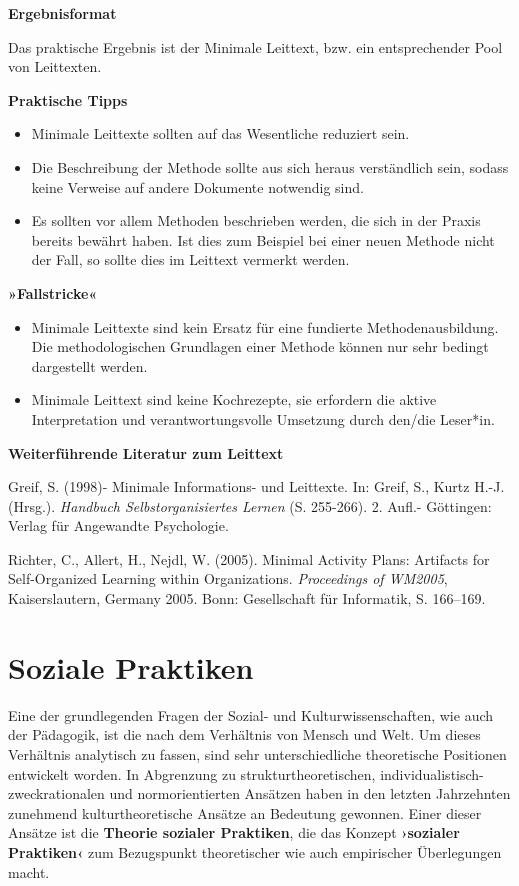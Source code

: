 \documentclass[
  a4paper,
]{book}
\providecommand{\tightlist}{%
  \setlength{\itemsep}{0pt}\setlength{\parskip}{0pt}}
\begin{document}
\textbf{Ergebnisformat}

Das praktische Ergebnis ist der Minimale Leittext, bzw. ein entsprechender Pool von Leittexten.

\textbf{Praktische Tipps}

\begin{itemize}
\tightlist
\item
  Minimale Leittexte sollten auf das Wesentliche reduziert sein.
\item
  Die Beschreibung der Methode sollte aus sich heraus verständlich sein, sodass keine Verweise auf andere Dokumente notwendig sind.
\item
  Es sollten vor allem Methoden beschrieben werden, die sich in der Praxis bereits bewährt haben. Ist dies zum Beispiel bei einer neuen Methode nicht der Fall, so sollte dies im Leittext vermerkt werden.
\end{itemize}

\textbf{»Fallstricke«}

\begin{itemize}
\tightlist
\item
  Minimale Leittexte sind kein Ersatz für eine fundierte Methodenausbildung. Die methodologischen Grundlagen einer Methode können nur sehr bedingt dargestellt werden.
\item
  Minimale Leittext sind keine Kochrezepte, sie erfordern die aktive Interpretation und verantwortungsvolle Umsetzung durch den/die Leser*in.
\end{itemize}

\textbf{Weiterführende Literatur zum Leittext}

Greif, S. (1998)- Minimale Informations- und Leittexte. In: Greif, S., Kurtz H.-J. (Hrsg.). \emph{Handbuch Selbstorganisiertes Lernen} (S. 255-266). 2. Aufl.- Göttingen: Verlag für Angewandte Psychologie.

Richter, C., Allert, H., Nejdl, W. (2005). Minimal Activity Plans: Artifacts for Self-Organized Learning within Organizations. \emph{Proceedings of WM2005}, Kaiserslautern, Germany 2005. Bonn: Gesellschaft für Informatik, S. 166--169.

\chapter{Soziale Praktiken}\label{soziale-praktiken}

Eine der grundlegenden Fragen der Sozial- und Kulturwissenschaften, wie auch der Pädagogik, ist die nach dem Verhältnis von Mensch und Welt. Um dieses Verhältnis analytisch zu fassen, sind sehr unterschiedliche theoretische Positionen entwickelt worden. In Abgrenzung zu strukturtheoretischen, individualistisch-zweckrationalen und normorientierten Ansätzen haben in den letzten Jahrzehnten zunehmend kulturtheoretische Ansätze an Bedeutung gewonnen. Einer dieser Ansätze ist die \textbf{Theorie sozialer Praktiken}, die das Konzept \textbf{›sozialer Praktiken‹} zum Bezugspunkt theoretischer wie auch empirischer Überlegungen macht.
\end{document}

